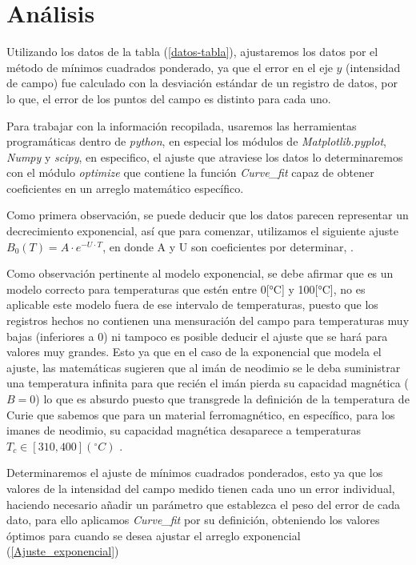 \section{Análisis}
Utilizando los datos de la tabla (\ref{datos-tabla}), ajustaremos los datos por el método de mínimos cuadrados ponderado, ya que el error en el eje $y$ (intensidad de campo) fue calculado con la desviación estándar de un registro de datos, por lo que, el error de los puntos del campo es distinto para cada uno.    


Para trabajar con la información recopilada, usaremos las herramientas programáticas dentro de \textit{python}, en especial los módulos de \textit{Matplotlib.pyplot}, \textit{Numpy} y \textit{scipy}, en especifico, el ajuste que atraviese los datos lo determinaremos con el módulo \textit{optimize} que contiene la función \textit{Curve\_fit} capaz de obtener coeficientes en un arreglo matemático específico.

Como primera observación, se puede deducir que los datos parecen representar un decrecimiento exponencial, así que para comenzar, utilizamos el siguiente ajuste $B_0(T)=A\cdot e^{-U\cdot T}$, en donde A y U son coeficientes por determinar,  .

Como observación pertinente al modelo exponencial, se debe afirmar que es un modelo correcto para temperaturas que estén entre 0[°C] y 100[°C], no es aplicable este modelo fuera de ese intervalo de temperaturas, puesto que los registros hechos no contienen una mensuración del campo para temperaturas muy bajas (inferiores a 0) ni tampoco es posible deducir el ajuste que se hará para valores muy grandes.
Esto ya que en el caso de la exponencial que modela el ajuste, las matemáticas sugieren que al imán de neodimio se le deba suministrar una temperatura infinita para que recién el imán pierda su capacidad magnética ($B=0$) lo que es absurdo puesto que transgrede la definición de la temperatura de Curie \cite{ref4} que sabemos que para un material ferromagnético, en específico, para los imanes de neodimio, su capacidad magnética desaparece a temperaturas $T_c\in [310,400] (^\circ C)$ \cite{ref5}.


Determinaremos el ajuste de  mínimos cuadrados ponderados, esto ya que los valores de la intensidad del campo medido tienen cada uno un error individual, haciendo necesario añadir un parámetro que establezca el peso del error de cada dato, para ello aplicamos \textit{Curve\_fit} por su definición, obteniendo los valores óptimos para cuando se desea ajustar el arreglo exponencial (\ref{Ajuste_exponencial})


